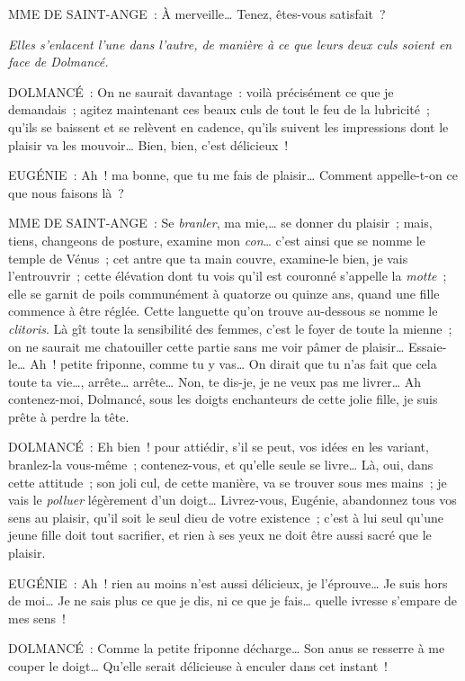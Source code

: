 \documentclass[french,twoside]{book} %
\begin{document}
MME DE SAINT-ANGE : À merveille… Tenez, êtes-vous satisfait ?\par
{\itshape Elles s’enlacent l’une dans l’autre, de manière à ce que leurs deux culs soient en face de Dolmancé.}\par
DOLMANCÉ : On ne saurait davantage : voilà précisément ce que je demandais ; agitez maintenant ces beaux culs de tout le feu de la lubricité ; qu’ils se baissent et se relèvent en cadence, qu’ils suivent les impressions dont le plaisir va les mouvoir… Bien, bien, c’est délicieux !\par
EUGÉNIE : Ah ! ma bonne, que tu me fais de plaisir… Comment appelle-t-on ce que nous faisons là ?\par
MME DE SAINT-ANGE : Se {\itshape branler}, ma mie,… se donner du plaisir ; mais, tiens, changeons de posture, examine mon {\itshape con}… c’est ainsi que se nomme le temple de Vénus ; cet antre que ta main couvre, examine-le bien, je vais l’entrouvrir ; cette élévation dont tu vois qu’il est couronné s’appelle la {\itshape motte} ; elle se garnit de poils communément à quatorze ou quinze ans, quand une fille commence à être réglée. Cette languette qu’on trouve au-dessous se nomme le {\itshape clitoris}. Là gît toute la sensibilité des femmes, c’est le foyer de toute la mienne ; on ne saurait me chatouiller cette partie sans me voir pâmer de plaisir… Essaie-le… Ah ! petite friponne, comme tu y vas… On dirait que tu n’as fait que cela toute ta vie…, arrête… arrête… Non, te dis-je, je ne veux pas me livrer… Ah contenez-moi, Dolmancé, sous les doigts enchanteurs de cette jolie fille, je suis prête à perdre la tête.\par
DOLMANCÉ : Eh bien ! pour attiédir, s’il se peut, vos idées en les variant, branlez-la vous-même ; contenez-vous, et qu’elle seule se livre… Là, oui, dans cette attitude ; son joli cul, de cette manière, va se trouver sous mes mains ; je vais le {\itshape polluer} légèrement d’un doigt… Livrez-vous, Eugénie, abandonnez tous vos sens au plaisir, qu’il soit le seul dieu de votre existence ; c’est à lui seul qu’une jeune fille doit tout sacrifier, et rien à ses yeux ne doit être aussi sacré que le plaisir.\par
EUGÉNIE : Ah ! rien au moins n’est aussi délicieux, je l’éprouve… Je suis hors de moi… Je ne sais plus ce que je dis, ni ce que je fais… quelle ivresse s’empare de mes sens !\par
DOLMANCÉ : Comme la petite friponne décharge… Son anus se resserre à me couper le doigt… Qu’elle serait délicieuse à enculer dans cet instant !\par
\end{document}
